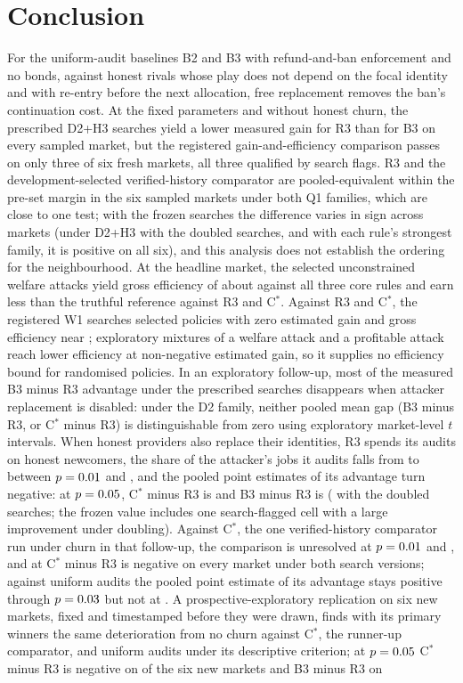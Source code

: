 \documentclass[11pt]{article}
\begin{document}
\section{Conclusion}\label{sec:conclusion}
For the uniform-audit baselines B2 and B3 with refund-and-ban enforcement and no bonds, against honest rivals whose play does not depend on the focal identity and with re-entry before the next allocation, free replacement removes the ban's continuation cost. At the fixed parameters and without honest churn, the prescribed D2+H3 searches yield a lower measured gain for R3 than for B3 on every sampled market, but the registered gain-and-efficiency comparison passes on only three of six fresh markets, all three qualified by search flags. R3 and the development-selected verified-history comparator are pooled-equivalent within the pre-set margin in the six sampled markets under both Q1 families, which are close to one test; with the frozen searches the difference varies in sign across markets (under D2+H3 with the doubled searches, and with each rule's strongest family, it is positive on all six), and this analysis does not establish the ordering for the neighbourhood. At the headline market, the selected unconstrained welfare attacks yield gross efficiency of about  against all three core rules and earn less than the truthful reference against R3 and C$^*$. Against R3 and C$^*$, the registered W1 searches selected policies with zero estimated gain and gross efficiency near ; exploratory mixtures of a welfare attack and a profitable attack reach lower efficiency at non-negative estimated gain, so it supplies no efficiency bound for randomised policies. In an exploratory follow-up, most of the measured B3 minus R3 advantage under the prescribed searches disappears when attacker replacement is disabled: under the D2 family, neither pooled mean gap (B3 minus R3, or C$^*$ minus R3) is distinguishable from zero using exploratory market-level $t$ intervals. When honest providers also replace their identities, R3 spends its audits on honest newcomers, the share of the attacker's jobs it audits falls from  to  between $p = 0.01$ and , and the pooled point estimates of its advantage turn negative: at $p = 0.05$, C$^*$ minus R3 is  and B3 minus R3 is  ( with the doubled searches; the frozen value includes one search-flagged cell with a large improvement under doubling). Against C$^*$, the one verified-history comparator run under churn in that follow-up, the comparison is unresolved at $p = 0.01$ and , and at  C$^*$ minus R3 is negative on every market under both search versions; against uniform audits the pooled point estimate of its advantage stays positive through $p = 0.03$ but not at . A prospective-exploratory replication on six new markets, fixed and timestamped before they were drawn, finds with its primary winners the same deterioration from no churn against C$^*$, the runner-up comparator, and uniform audits under its descriptive criterion; at $p = 0.05$ C$^*$ minus R3 is negative on  of the six new markets and B3 minus R3 on 
\end{document}
